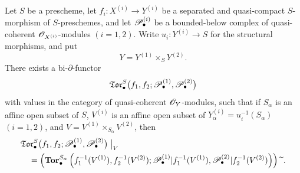 \begin{theorem}[6.7.3]
\label{III.6.7.3}
Let $S$ be a prescheme, let
$f_i:X^{(i)}\to Y^{(i)}$ be a separated and quasi-compact
$S$-morphism of $S$-preschemes, and let
$\mathscr{P}_\bullet^{(i)}$ be a bounded-below complex of
quasi-coherent $\mathscr{O}_{X^{(i)}}$-modules $(i=1,2)$.  Write
$u_i:Y^{(i)}\to S$ for the structural morphisms, and put
\[
  Y=Y^{(1)}\times_SY^{(2)}.
\]
There exists a bi-$\partial$-functor
\[
  \mathfrak{Tor}_\bullet^S
  \bigl(
    f_1,f_2;
    \mathscr{P}_\bullet^{(1)},\mathscr{P}_\bullet^{(2)}
  \bigr)
\]
with values in the category of quasi-coherent
$\mathscr{O}_Y$-modules, such that if $S_\alpha$ is an affine open
subset of $S$, $V^{(i)}$ is an affine open subset of
$Y_\alpha^{(i)}=u_i^{-1}(S_\alpha)$ $(i=1,2)$, and
$V=V^{(1)}\times_{S_\alpha}V^{(2)}$, then
\[
\begin{split}
  &\mathfrak{Tor}_\bullet^S
  \bigl(
    f_1,f_2;
    \mathscr{P}_\bullet^{(1)},\mathscr{P}_\bullet^{(2)}
  \bigr)\bigm|_V\\
  &\quad=
  \left(
    \mathbf{Tor}_\bullet^{S_\alpha}
    \left(
      f_1^{-1}(V^{(1)}),f_2^{-1}(V^{(2)});
      \mathscr{P}_\bullet^{(1)}|f_1^{-1}(V^{(1)}),
      \mathscr{P}_\bullet^{(2)}|f_2^{-1}(V^{(2)})
    \right)
  \right){\,\widetilde{\,}\,} .
\end{split}
\]



\end{theorem}
